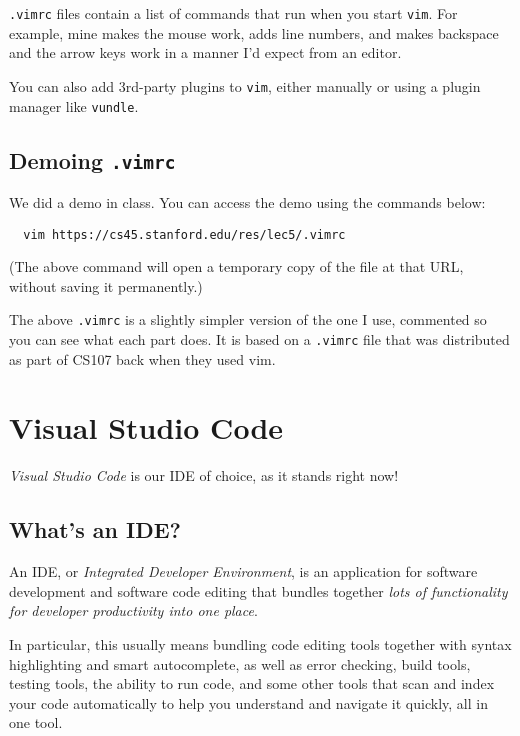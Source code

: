 {\tt .vimrc} files contain a list of commands that run when you start {\tt vim}.
For example, mine makes the mouse work, adds line numbers, and makes backspace and
the arrow keys work in a manner I'd expect from an editor.

You can also add 3rd-party plugins to {\tt vim}, either manually or using a
plugin manager like {\tt vundle}.

\subsection{Demoing {\tt .vimrc}}

\begin{example}[codeblock]
  We did a demo in class. You can access the demo using the commands below:
  \begin{verbatim}
  vim https://cs45.stanford.edu/res/lec5/.vimrc
  \end{verbatim}
\end{example}

(The above command will open a temporary copy of the file at that URL, without
saving it permanently.)

The above {\tt .vimrc} is a slightly simpler version of the one I use, commented
so you can see what each part does. It is based on a {\tt .vimrc} file that
was distributed as part of CS107 back when they used vim.

\section{Visual Studio Code}

{\em Visual Studio Code} is our IDE of choice, as it stands right now!

\subsection{What's an IDE?}

An IDE, or {\em Integrated Developer Environment}, is an application for software
development and software code editing that bundles together {\em lots of functionality
for developer productivity into one place}.

In particular, this usually means bundling code editing tools together with
syntax highlighting and smart autocomplete, as well as error checking, build tools,
testing tools, the ability to run code, and some other tools that scan and index
your code automatically to help you understand and navigate it quickly, all in one tool.

